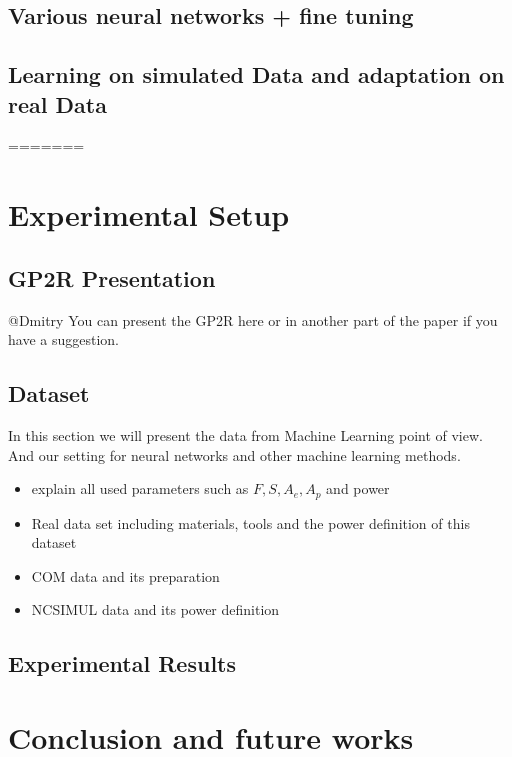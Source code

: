 \documentclass{article}
\begin{document}
\subsection{Various neural networks + fine tuning}
\subsection{Learning on simulated Data and adaptation on real Data}
=======


\section{Experimental Setup}
\subsection{GP2R Presentation}
@Dmitry You can present the GP2R here or in another part of the paper if you have a suggestion.
\subsection{Dataset}
In this section we will present the data from Machine Learning point of view. And our setting for neural networks and other machine learning methods.
\begin{itemize}
\item explain all used parameters such as $F, S, A_e, A_p$ and power 
\item Real data set including materials, tools and the power definition of this dataset
\item COM data and its preparation 
\item NCSIMUL data and its power definition
\end{itemize} 
\subsection{Experimental Results}
 
\section{Conclusion and future works}
\end{document}
